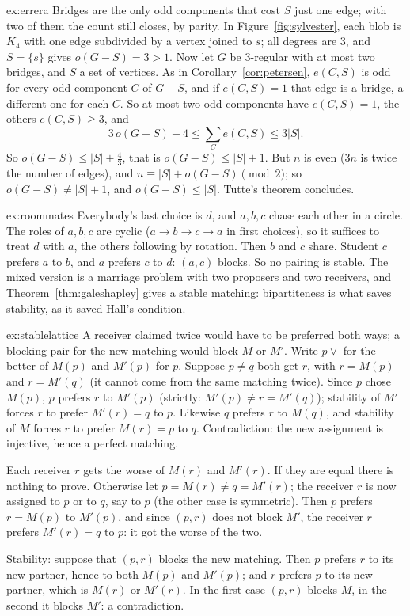 \begin{solution}{ex:errera}
\idea Bridges are the only odd components that cost $S$ just one edge; with two of them the count still closes, by parity.
\writeup In Figure~\ref{fig:sylvester}, each blob is $K_4$ with one edge subdivided by a vertex joined to $s$; all degrees are $3$, and $S=\{s\}$ gives $o(G-S)=3>1$.
Now let $G$ be $3$-regular with at most two bridges, and $S$ a set of vertices. As in Corollary~\ref{cor:petersen}, $e(C,S)$ is odd for every odd component $C$ of
$G-S$, and if $e(C,S)=1$ that edge is a bridge, a different one for each $C$. So at most two odd components have $e(C,S)=1$, the others $e(C,S)\ge3$, and
\[
3\,o(G-S)-4\le\sum_Ce(C,S)\le3|S|.
\]
So $o(G-S)\le|S|+\frac43$, that is $o(G-S)\le|S|+1$. But $n$ is even ($3n$ is twice the number of edges), and $n\equiv|S|+o(G-S)\pmod 2$; so $o(G-S)\ne|S|+1$,
and $o(G-S)\le|S|$. Tutte's theorem concludes.
\end{solution}

\begin{solution}{ex:roommates}
\idea Everybody's last choice is $d$, and $a,b,c$ chase each other in a circle.
\writeup The roles of $a,b,c$ are cyclic ($a\to b\to c\to a$ in first choices), so it suffices to treat $d$ with $a$, the others following by rotation. Then $b$
and $c$ share. Student $c$ prefers $a$ to $b$, and $a$ prefers $c$ to $d$: $(a,c)$ blocks. So no pairing is stable. The mixed version is a marriage problem
with two proposers and two receivers, and Theorem~\ref{thm:galeshapley} gives a stable matching: bipartiteness is what saves stability,
as it saved Hall's condition.
\end{solution}

\begin{solution}{ex:stablelattice}
\idea A receiver claimed twice would have to be preferred both ways; a blocking pair for the new matching would block $M$ or $M'$.
\writeup Write $p\vee$ for the better of $M(p)$ and $M'(p)$ for $p$. Suppose $p\ne q$ both get $r$, with $r=M(p)$ and $r=M'(q)$ (it cannot come from the same matching
twice). Since $p$ chose $M(p)$, $p$ prefers $r$ to $M'(p)$ (strictly: $M'(p)\ne r=M'(q)$); stability of $M'$ forces $r$ to prefer $M'(r)=q$ to $p$. Likewise $q$ prefers $r$ to $M(q)$, and
stability of $M$ forces $r$ to prefer $M(r)=p$ to $q$. Contradiction: the new assignment is injective, hence a perfect matching.

Each receiver $r$ gets the worse of $M(r)$ and $M'(r)$. If they are equal there is nothing to prove. Otherwise let $p=M(r)\ne q=M'(r)$; the
receiver $r$ is now assigned to $p$ or to $q$, say to $p$ (the other case is symmetric). Then $p$ prefers $r=M(p)$ to $M'(p)$, and since $(p,r)$ does not block
$M'$, the receiver $r$ prefers $M'(r)=q$ to $p$: it got the worse of the two.

Stability: suppose that $(p,r)$ blocks the new matching. Then $p$ prefers $r$ to its new partner, hence to both $M(p)$ and $M'(p)$; and $r$ prefers $p$ to
its new partner, which is $M(r)$ or $M'(r)$. In the first case $(p,r)$ blocks $M$, in the second it blocks $M'$: a contradiction.
\end{solution}


